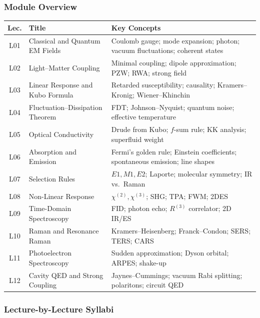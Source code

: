 \documentclass[11pt,a4paper]{article}
\begin{document}
\subsubsection*{Module Overview}
\begin{center}
\begin{tabularx}{\textwidth}{clX}
\toprule
\textbf{Lec.} & \textbf{Title} & \textbf{Key Concepts}\\
\midrule
L01 & Classical and Quantum EM Fields & Coulomb gauge; mode expansion; photon; vacuum fluctuations; coherent states\\
L02 & Light--Matter Coupling & Minimal coupling; dipole approximation; PZW; RWA; strong field\\
L03 & Linear Response and Kubo Formula & Retarded susceptibility; causality; Kramers--Kronig; Wiener--Khinchin\\
L04 & Fluctuation--Dissipation Theorem & FDT; Johnson--Nyquist; quantum noise; effective temperature\\
L05 & Optical Conductivity & Drude from Kubo; $f$-sum rule; KK analysis; superfluid weight\\
L06 & Absorption and Emission & Fermi's golden rule; Einstein coefficients; spontaneous emission; line shapes\\
L07 & Selection Rules & $E1,M1,E2$; Laporte; molecular symmetry; IR vs.\ Raman\\
L08 & Non-Linear Response & $\chi^{(2)},\chi^{(3)}$; SHG; TPA; FWM; 2DES\\
L09 & Time-Domain Spectroscopy & FID; photon echo; $R^{(3)}$ correlator; 2D IR/ES\\
L10 & Raman and Resonance Raman & Kramers--Heisenberg; Franck--Condon; SERS; TERS; CARS\\
L11 & Photoelectron Spectroscopy & Sudden approximation; Dyson orbital; ARPES; shake-up\\
L12 & Cavity QED and Strong Coupling & Jaynes--Cummings; vacuum Rabi splitting; polaritons; circuit QED\\
\bottomrule
\end{tabularx}
\end{center}

\subsubsection*{Lecture-by-Lecture Syllabi}
\end{document}
